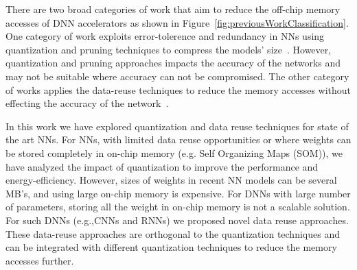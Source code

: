 \documentclass[a4paper,10pt]{article}
\begin{document}
There are two broad categories of work that aim to reduce the off-chip memory accesses of DNN accelerators as shown in Figure~\ref{fig:previousWorkClassification}. One category of work exploits error-tolerence and redundancy in NNs using quantization and pruning techniques to compress the models' size~\cite{ferreira2016fpga,wang2018c,chang2015recurrent,han2017ese,lee2016fpga}. However, quantization and pruning approaches impacts the accuracy of the networks and may not be suitable where accuracy can not be compromised. The other category of works applies the data-reuse techniques to reduce the memory accesses without effecting the accuracy of the network~\cite{zhang2015optimizing,Li2018SmartShuttleOO,que2019efficient,park2020time}. 

In this work we have explored quantization and data reuse techniques for state of the art NNs. For NNs, with limited data reuse opportunities or where weights can be stored completely in on-chip memory (e.g. Self Organizing Maps (SOM)), we have analyzed the impact of 
quantization to improve the performance and energy-efficiency.  However, sizes of weights in recent NN models can be several MB's, and using large on-chip memory is expensive. For DNNs with large number of parameters, storing all the weight in on-chip memory is not a scalable solution. For such DNNs (e.g.,CNNs and RNNs) we proposed novel data reuse approaches. These data-reuse approaches are orthogonal to the quantization techniques and can be integrated with different quantization techniques to reduce the memory accesses further. 
\end{document}
